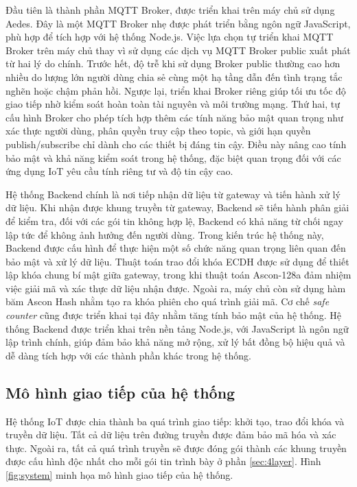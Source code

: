 Đầu tiên là thành phần MQTT Broker, được triển khai trên máy chủ sử dụng Aedes. Đây là một MQTT Broker nhẹ được phát triển bằng ngôn ngữ JavaScript, phù hợp để tích hợp với hệ thống Node.js. Việc lựa chọn tự triển khai MQTT Broker trên máy chủ thay vì sử dụng các dịch vụ MQTT Broker public xuất phát từ hai lý do chính. Trước hết, độ trễ khi sử dụng Broker public thường cao hơn nhiều do lượng lớn người dùng chia sẻ cùng một hạ tầng dẫn đến tình trạng tắc nghẽn hoặc chậm phản hồi. Ngược lại, triển khai Broker riêng giúp tối ưu tốc độ giao tiếp nhờ kiểm soát hoàn toàn tài nguyên và môi trường mạng. Thứ hai, tự cấu hình Broker cho phép tích hợp thêm các tính năng bảo mật quan trọng như xác thực người dùng, phân quyền truy cập theo topic, và giới hạn quyền publish/subscribe chỉ dành cho các thiết bị đáng tin cậy. Điều này nâng cao tính bảo mật và khả năng kiểm soát trong hệ thống, đặc biệt quan trọng đối với các ứng dụng IoT yêu cầu tính riêng tư và độ tin cậy cao. 

Hệ thống Backend chính là nơi tiếp nhận dữ liệu từ gateway và tiến hành xử lý dữ liệu. Khi nhận được khung truyền từ gateway, Backend sẽ tiến hành phân giải để kiểm tra, đối với các gói tin không hợp lệ, Backend có khả năng từ chối ngay lập tức để không ảnh hưởng đến người dùng. Trong kiến trúc hệ thống này, Backend được cấu hình để thực hiện một số chức năng quan trọng liên quan đến bảo mật và xử lý dữ liệu. Thuật toán trao đổi khóa ECDH được sử dụng để thiết lập khóa chung bí mật giữa gateway, trong khi thuật toán Ascon-128a đảm nhiệm việc giải mã và xác thực dữ liệu nhận được. Ngoài ra, máy chủ còn sử dụng hàm băm Ascon Hash nhằm tạo ra khóa phiên cho quá trình giải mã. Cơ chế \textit{safe counter} cũng được triển khai tại đây nhằm tăng tính bảo mật của hệ thống. Hệ thống Backend được triển khai trên nền tảng Node.js, với JavaScript là ngôn ngữ lập trình chính, giúp đảm bảo khả năng mở rộng, xử lý bất đồng bộ hiệu quả và dễ dàng tích hợp với các thành phần khác trong hệ thống.


\subsection{Mô hình giao tiếp của hệ thống}
\label{sec:tongquan}
Hệ thống IoT được chia thành ba quá trình giao tiếp: khởi tạo, trao đổi khóa và truyền dữ liệu. Tất cả dữ liệu trên đường truyền được đảm bảo mã hóa và xác thực. Ngoài ra, tất cả quá trình truyền sẽ được đóng gói thành các khung truyền được cấu hình độc nhất cho mỗi gói tin trình bày ở phần \ref{sec:4layer}. Hình \ref{fig:system} minh họa mô hình giao tiếp của hệ thống.

